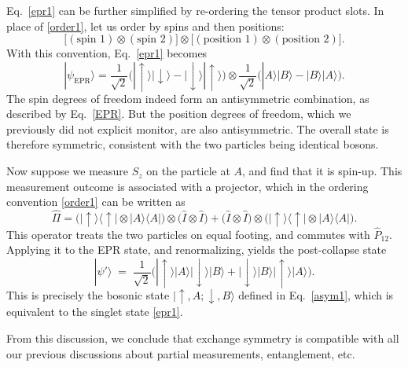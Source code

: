 \documentclass[prx,12pt]{revtex4-2}
\begin{document}
Eq.~\eqref{epr1} can be further simplified by re-ordering the tensor
product slots.  In place of \eqref{order1}, let us order by spins and
then positions:
\begin{equation}
  \Big[
    (\textrm{spin 1}) \otimes (\textrm{spin 2}) \Big]
  \otimes
  \Big[
    (\textrm{position 1}) \otimes (\textrm{position 2}) \Big].
  \label{order2}
\end{equation}
With this convention, Eq.~\eqref{epr1} becomes
\begin{equation}
  |\psi_{\mathrm{EPR}}\rangle = \frac{1}{\sqrt{2}} \Big(
  |\!\uparrow\rangle |\!\downarrow\rangle - |\!\downarrow\rangle |\!\uparrow\rangle \Big)  
  \otimes \frac{1}{\sqrt{2}} \Big(
  |A\rangle |B\rangle - |B\rangle |A\rangle \Big).
  \label{eprsplit}
\end{equation}
The spin degrees of freedom indeed form an antisymmetric combination,
as described by Eq.~\eqref{EPR}.  But the position degrees of freedom,
which we previously did not explicit monitor, are also antisymmetric.
The overall state is therefore symmetric, consistent with the two
particles being identical bosons.

Now suppose we measure $S_z$ on the particle at $A$, and find that it
is spin-up.  This measurement outcome is associated with a projector,
which in the ordering convention \eqref{order1} can be written as
\begin{equation}
  \hat{\Pi} = \Big(|\!\uparrow\rangle \langle\uparrow\!| \otimes |A\rangle \langle A|\Big)
  \otimes\Big( \hat{I} \otimes \hat{I}\Big)
  + \Big(\hat{I} \otimes \hat{I} \Big) \otimes \Big(
  |\!\uparrow\rangle \langle\uparrow\!| \otimes |A\rangle \langle A| \Big).
\end{equation}
This operator treats the two particles on equal footing, and commutes
with $\hat{P}_{12}$.  Applying it to the EPR state, and renormalizing,
yields the post-collapse state
\begin{equation}
  |\psi'\rangle \;=\;
  \frac{1}{\sqrt{2}} \Big(
    |\!\uparrow\rangle|A\rangle |\!\downarrow\rangle|B\rangle
    + |\!\downarrow\rangle|B\rangle |\!\uparrow\rangle|A\rangle \Big).
\end{equation}
This is precisely the bosonic state $|\uparrow,A;\downarrow,B\rangle$
defined in Eq.~\eqref{asym1}, which is equivalent to the singlet state
\eqref{epr1}.

From this discussion, we conclude that exchange symmetry is compatible
with all our previous discussions about partial measurements,
entanglement, etc.
\end{document}

